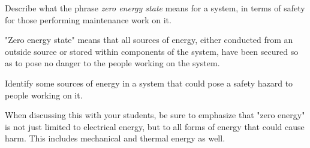 

Describe what the phrase {\it zero energy state} means for a system, in terms of safety for those performing maintenance work on it.







"Zero energy state" means that all sources of energy, either conducted from an outside source or stored within components of the system, have been secured so as to pose no danger to the people working on the system.

\vskip 10pt

Identify some sources of energy in a system that could pose a safety hazard to people working on it.







When discussing this with your students, be sure to emphasize that "zero energy" is not just limited to electrical energy, but to all forms of energy that could cause harm.  This includes mechanical and thermal energy as well.




